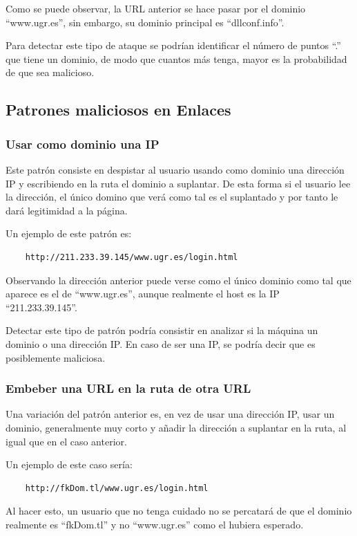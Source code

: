 Como se puede observar, la URL anterior se hace pasar por el dominio “www.ugr.es”, sin embargo, su dominio principal es “dllconf.info”.

Para detectar este tipo de ataque se podrían identificar el número de puntos “.” que tiene un dominio, de modo que cuantos más tenga, mayor es la probabilidad de que sea malicioso.

\subsection{Patrones maliciosos en Enlaces}
\subsubsection{Usar como dominio una IP}
Este patrón consiste en despistar al usuario usando como dominio una dirección IP y escribiendo en la ruta el dominio a suplantar. De esta forma si el usuario lee la dirección, el único domino que verá como tal es el suplantado y por tanto le dará legitimidad a la página. 

Un ejemplo de este patrón es: 

\begin{verbatim}
    http://211.233.39.145/www.ugr.es/login.html 
\end{verbatim}

Observando la dirección anterior puede verse como el único dominio como tal que aparece es el de “www.ugr.es”, aunque realmente el host es la IP “211.233.39.145”.

Detectar este tipo de patrón podría consistir en analizar si la máquina un dominio o una dirección IP. En caso de ser una IP, se podría decir que es posiblemente maliciosa. 

\subsubsection{Embeber una URL en la ruta de otra URL}
Una variación del patrón anterior es, en vez de usar una dirección IP, usar un dominio, generalmente muy corto y añadir la dirección a suplantar en la ruta, al igual que en el caso anterior.

Un ejemplo de este caso sería: 

\begin{verbatim}
    http://fkDom.tl/www.ugr.es/login.html 
\end{verbatim}

Al hacer esto, un usuario que no tenga cuidado no se percatará de que el dominio realmente es “fkDom.tl” y no “www.ugr.es” como el hubiera esperado. 

